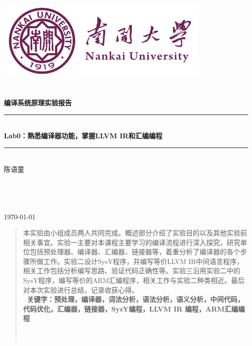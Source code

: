 \documentclass[UTF8,a4paper,10pt]{ctexart}
\newcommand{\sihao}{\fontsize{14pt}{21pt}\selectfont}            %
\newcommand{\HRule}{\rule{\linewidth}{0.5mm}}%
\begin{document}
\begin{titlepage}
    \begin{center}
    \includegraphics[width=0.8\textwidth]{NKU.png}\\[1cm]    
    \textsc{\Huge {} }\\[0.9cm]
    \textsc{\huge {}}\\[0.5cm]
    \textsc{\Large \textbf{编译系统原理实验报告}}\\[0.8cm]
    \HRule \\[0.9cm]
    { \LARGE \bfseries Lab0：熟悉编译器功能，掌握LLVM IR和汇编编程}\\[0.4cm]
    \HRule \\[2.0cm]
    \centering
    \textsc{\LARGE 陈语童\kaishu{\ \ \ \ }}\\[0.5cm]
    \textsc{\LARGE {}}\\[0.5cm]
    \textsc{\LARGE {}}\\[0.5cm]
    \textsc{\LARGE {}}\\[0.5cm]
    \textsc{\LARGE {}}\\[0.5cm]
    \vfill
    {\Large \today}
    \end{center}
\end{titlepage}
\newpage
\thispagestyle{empty}
\renewcommand{\abstractname}{\kaishu \sihao \textbf{摘要}}
    \begin{abstract}
本实验由小组成员两人共同完成。概述部分介绍了实验目的以及其他实验前相关事宜。实验一主要对本课程主要学习的编译流程进行深入探究，研究单位包括预处理器、编译器、汇编器、链接器等，着重分析了编译器的各个步骤所做工作。实验二设计SysY程序，并编写等价LLVM IR中间语言程序，相关工作包括分析编写思路、验证代码正确性等。实验三沿用实验二中的SysY程序，编写等价的ARM汇编程序，相关工作与实验二种类相近。最后对本次实验进行总结，记录收获心得。
\vspace{1em}
\noindent  %
        \textbf{\\\ 关键字：预处理，编译器，词法分析，语法分析，语义分析，中间代码，代码优化，汇编器，链接器，SysY编程，LLVM IR 编程，ARM汇编编程}\textbf{} \\\ \\\
    \end{abstract}
\end{document}
